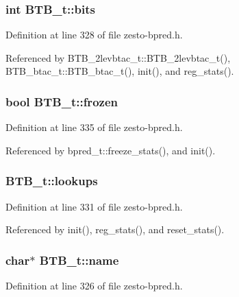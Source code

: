 \subsubsection[{bits}]{\setlength{\rightskip}{0pt plus 5cm}int {\bf BTB\_\-t::bits}\hspace{0.3cm}{\tt  [protected]}}\label{classBTB__t_2782a3d27579b0248402ce00e7919c19}




Definition at line 328 of file zesto-bpred.h.

Referenced by BTB\_\-2levbtac\_\-t::BTB\_\-2levbtac\_\-t(), BTB\_\-btac\_\-t::BTB\_\-btac\_\-t(), init(), and reg\_\-stats().
\subsubsection[{frozen}]{\setlength{\rightskip}{0pt plus 5cm}bool {\bf BTB\_\-t::frozen}\hspace{0.3cm}{\tt  [protected]}}\label{classBTB__t_f1ccd796d1cd8fcb8f33abeefd47cb4b}




Definition at line 335 of file zesto-bpred.h.

Referenced by bpred\_\-t::freeze\_\-stats(), and init().
\subsubsection[{lookups}]{ {\bf BTB\_\-t::lookups}\hspace{0.3cm}{\tt  [protected]}}\label{classBTB__t_9d2b4c038ab6a3ada925695d2a20067c}




Definition at line 331 of file zesto-bpred.h.

Referenced by init(), reg\_\-stats(), and reset\_\-stats().
\subsubsection[{name}]{\setlength{\rightskip}{0pt plus 5cm}char$\ast$ {\bf BTB\_\-t::name}\hspace{0.3cm}{\tt  [protected]}}\label{classBTB__t_272d5f2c0460c8b8431109ee69c7f187}




Definition at line 326 of file zesto-bpred.h.

